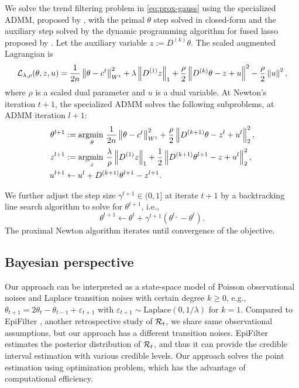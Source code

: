 We solve the trend filtering problem in \eqref{eq:prox-gauss} using the specialized ADMM, proposed by \cite{ramdas2016fast}, with the primal $\theta$ step solved in closed-form and the auxiliary step solved by the dynamic programming algorithm for fused lasso proposed by \cite{johnson2013dynamic}. Let the auxiliary variable $z:= D^{(k)}\theta$. The scaled augmented Lagrangian is $$\mathcal{L}_{\lambda, \rho}(\theta, z, u) = \frac{1}{2n} \left\lVert \theta - c^{t} \right\rVert_{W^t}^2 + \lambda \left\lVert D^{(1)}z \right\rVert_1 + \frac{\rho}{2} \left\lVert D^{(k)}\theta - z + u \right\rVert^2 - \frac{\rho}{2} \left\lVert u \right\rVert^2, $$ where $\rho$ is a scaled dual parameter and $u$ is a dual variable. At Newton's iteration $t+1$, the specialized ADMM solves the following subproblems, at ADMM iteration $l+1$: 
\begin{equation}
  \begin{split}
      \theta^{l+1} &:= \underset{\theta}{\operatorname*{argmin}\ } \frac{1}{2n} \left\lVert \theta - c^{t} \right\rVert_{W^t}^2 + \frac{\rho}{2} \left\lVert D^{(k+1)} \theta - z^l + u^l \right\rVert_2^2, \\
      z^{l+1} &:= \underset{z}{\operatorname*{argmin}\ } \frac{\lambda}{\rho} \left\lVert D^{(1)} z \right\rVert_1 + \frac{1}{2} \left\lVert D^{(k+1)} \theta^{l+1} - z + u^l \right\rVert_2^2, \\
      u^{l+1} &\leftarrow u^l + D^{(k+1)} \theta^{l+1} - z^{l+1}.
  \end{split}
\end{equation}

We further adjust the step size $\gamma^{t+1} \in (0,1]$ at iterate $t+1$ by a backtracking line search algorithm to solve for $\theta^{t+1}$, i.e.,   
$$\theta^{t+1} \leftarrow \theta^t + \gamma^{t+1} (\theta^{t_+} - \theta^t).$$ The proximal Newton algorithm iterates until convergence of the objective.


\subsection{Bayesian perspective}

Our approach can be interpreted as a state-space model of Poisson observational noises and Laplace transition noises with certain degree $k\geq 0$, e.g., $\theta_{t+1} = 2\theta_t - \theta_{t-1} + \varepsilon_{t+1}$ with $\varepsilon_{t+1}\sim \mathrm{Laplace}(0,1/\lambda)$ for $k=1$. Compared to EpiFilter \citep{parag2021improved}, another retrospective study of $\mathcal{R}_t$, we share same observational assumptions, but our approach has a different transition noises. 
EpiFilter estimates the posterior distribution of $\mathcal{R}_t$, and thus it can provide the credible interval estimation with various credible levels. Our approach solves the point estimation using optimization problem, which has the advantage of computational efficiency. 

